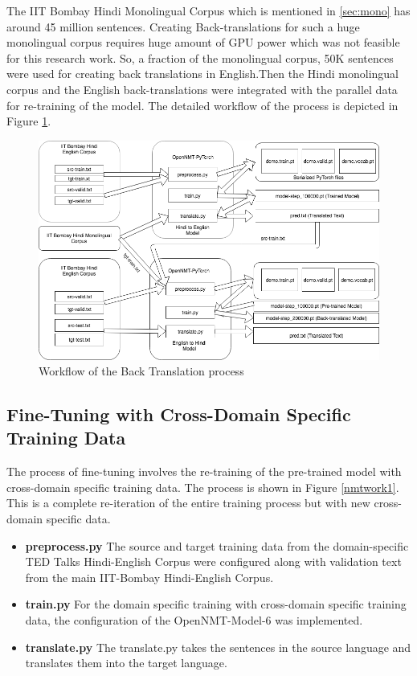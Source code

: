 The IIT Bombay Hindi Monolingual Corpus which is mentioned in \ref{sec:mono} has around 45 million sentences. Creating Back-translations for such a huge monolingual corpus requires huge amount of GPU power which was not feasible for this research work. So, a fraction of the monolingual corpus, 50K sentences were used for creating back translations in English.Then the Hindi monolingual corpus and the English back-translations were integrated with the parallel data for re-training of the model. The detailed workflow of the process is depicted in Figure \ref{backtrans}.

\begin{figure}[h]
\includegraphics[width=\textwidth]{figures/backtrans.png}
\caption{Workflow of the Back Translation process} 
\label{backtrans}
\end{figure}

\subsection{Fine-Tuning with Cross-Domain Specific Training Data}
The process of fine-tuning involves the re-training of the pre-trained model with cross-domain specific training data. The process is shown in Figure \ref{nmtwork1}. This is a complete re-iteration of the entire training process but with new cross-domain specific data.
\begin{itemize}
    \item \textbf{preprocess.py} The source and target training data from the domain-specific TED Talks Hindi-English Corpus were configured along with validation text from the main IIT-Bombay Hindi-English Corpus.
    \item\textbf{train.py} For the domain specific training with cross-domain specific training data, the configuration of the OpenNMT-Model-6 was implemented.
    \item\textbf{translate.py} The translate.py takes the sentences in the source language and translates them into the target language.
\end{itemize}


